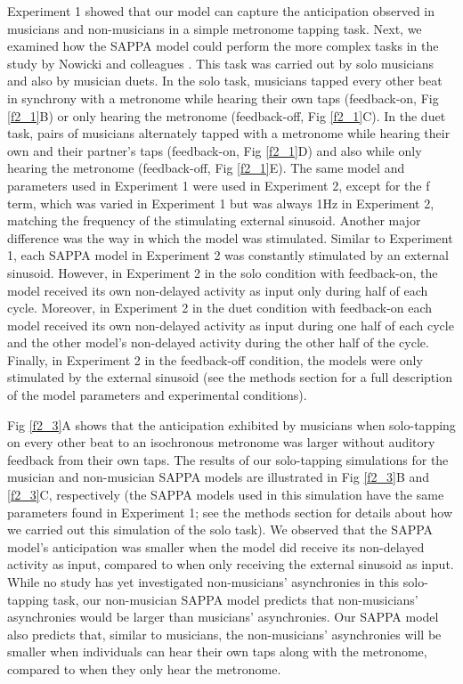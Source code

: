 \documentclass{report}
\begin{document}
Experiment 1 showed that our model can capture the anticipation observed in musicians and non-musicians in a simple metronome tapping task. Next, we examined how the SAPPA model could perform the more complex tasks in the study by Nowicki and colleagues \cite{nowicki2013mutual}. This task was carried out by solo musicians and also by musician duets. In the solo task, musicians tapped every other beat in synchrony with a metronome while hearing their own taps (feedback-on, Fig \ref{f2_1}B) or only hearing the metronome (feedback-off, Fig \ref{f2_1}C). In the duet task, pairs of musicians alternately tapped with a metronome while hearing their own and their partner's taps (feedback-on, Fig \ref{f2_1}D) and also while only hearing the metronome (feedback-off, Fig \ref{f2_1}E). The same model and parameters used in Experiment 1 were used in Experiment 2, except for the f term, which was varied in Experiment 1 but was always 1Hz in Experiment 2, matching the frequency of the stimulating external sinusoid. Another major difference was the way in which the model was stimulated. Similar to Experiment 1, each SAPPA model in Experiment 2 was constantly stimulated by an external sinusoid. However, in Experiment 2 in the solo condition with feedback-on, the model received its own non-delayed activity as input only during half of each cycle. Moreover, in Experiment 2 in the duet condition with feedback-on each model received its own non-delayed activity as input during one half of each cycle and the other model's non-delayed activity during the other half of the cycle. Finally, in Experiment 2 in the feedback-off condition, the models were only stimulated by the external sinusoid (see the methods section for a full description of the model parameters and experimental conditions).

Fig \ref{f2_3}A shows that the anticipation exhibited by musicians when solo-tapping on every other beat to an isochronous metronome was larger without auditory feedback from their own taps. The results of our solo-tapping simulations for the musician and non-musician SAPPA models are illustrated in Fig \ref{f2_3}B and \ref{f2_3}C, respectively (the SAPPA models used in this simulation have the same parameters found in Experiment 1; see the methods section for details about how we carried out this simulation of the solo task). We observed that the SAPPA model's anticipation was smaller when the model did receive its non-delayed activity as input, compared to when only receiving the external sinusoid as input. While no study has yet investigated non-musicians' asynchronies in this solo-tapping task, our non-musician SAPPA model predicts that non-musicians' asynchronies would be larger than musicians' asynchronies. Our SAPPA model also predicts that, similar to musicians, the non-musicians' asynchronies will be smaller when individuals can hear their own taps along with the metronome, compared to when they only hear the metronome.
\end{document}
